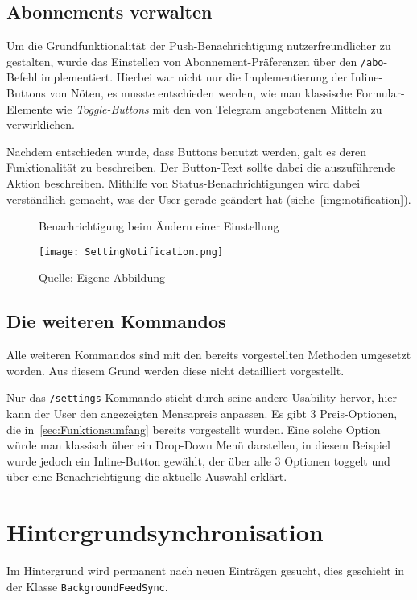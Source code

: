 \subsection{Abonnements verwalten}
Um die Grundfunktionalität der Push-Benachrichtigung nutzerfreundlicher zu gestalten, wurde das Einstellen von Abonnement-Präferenzen über den \texttt{/abo}-Befehl implementiert. Hierbei war nicht nur die Implementierung der Inline-Buttons von Nöten, es musste entschieden werden, wie man klassische Formular-Elemente wie \emph{Toggle-Buttons} mit den von Telegram angebotenen Mitteln zu verwirklichen.

Nachdem entschieden wurde, dass Buttons benutzt werden, galt es deren Funktionalität zu beschreiben. Der Button-Text sollte dabei die auszuführende Aktion beschreiben. Mithilfe von Status-Benachrichtigungen wird dabei verständlich gemacht, was der User gerade geändert hat (siehe~\autoref{img:notification}).

\begin{figure}[!htb]
    \centering
    \caption{Benachrichtigung beim Ändern einer Einstellung}
      \texttt{[image: SettingNotification.png]}
      \label{img:notification}
    \caption*{Quelle: Eigene Abbildung}
\end{figure}

\subsection{Die weiteren Kommandos}
Alle weiteren Kommandos sind mit den bereits vorgestellten Methoden umgesetzt worden. Aus diesem Grund werden diese nicht detailliert vorgestellt.

Nur das \texttt{/settings}-Kommando sticht durch seine andere Usability hervor, hier kann der User den angezeigten Mensapreis anpassen. Es gibt 3 Preis-Optionen, die in~\autoref{sec:Funktionsumfang} bereits vorgestellt wurden. Eine solche Option würde man klassisch über ein Drop-Down Menü darstellen, in diesem Beispiel wurde jedoch ein Inline-Button gewählt, der über alle 3 Optionen toggelt und über eine Benachrichtigung die aktuelle Auswahl erklärt.

\section{Hintergrundsynchronisation}
Im Hintergrund wird permanent nach neuen Einträgen gesucht, dies geschieht in der Klasse \texttt{BackgroundFeedSync}.

